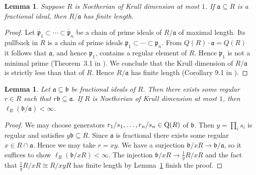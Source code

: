 \documentclass{amsart}
\theoremstyle{plain}
\newtheorem{lemma}[theorem]{Lemma}
\theoremstyle{definition}
\newcommand{\p}{\ensuremath{\mathfrak{p}}}
\begin{document}
\begin{lemma}\label{lem:artinian_quotient}
Suppose \(R\) is Noetherian of Krull dimension at most \(1\). If \(\mathfrak{a}\subseteq R\) is a fractional ideal, then \(R/\mathfrak{a}\) has finite length.
\end{lemma}
\begin{proof}
Let \(\overline{\p}_1\subset\dotsm\subset\overline{\p}_n\) be a chain of prime ideals of \(R/\mathfrak{a}\) of maximal length.
Its pullback in \(R\) is a chain of prime ideals \(\p_1\subset\dotsm\subset\p_n\).
From $Q(R)\cdot\mathfrak{a}=Q(R)$ it follows that $\mathfrak{a}$, and hence $\p_1$, contains a regular element of $R$.
Hence \(\p_1\) is not a minimal prime (Theorem~3.1 in \cite{Eisenbud}).
We conclude that the Krull dimension of \(R/\mathfrak{a}\) is strictly less than that of \(R\).
Hence \(R/\mathfrak{a}\) has finite length (Corollary 9.1 in \cite{Eisenbud}).
\end{proof}

\begin{lemma}\label{lem:quotient_length}
Let \(\mathfrak{a}\subseteq\mathfrak{b}\) be fractional ideals of \(R\).
Then there exists some regular \(r\in R\) such that \(r\mathfrak{b}\subseteq\mathfrak{a}\).
If \(R\) is Noetherian of Krull dimension at most \(1\), then \(\ell_R(\mathfrak{b}/\mathfrak{a})<\infty\).
\end{lemma}
\begin{proof}
We may choose generators \(r_1/s_1,\dotsc,r_n/s_n\in\textup{Q}(R)\) of \(\mathfrak{b}\).
Then \(y=\prod_i s_i\) is regular and satisfies \(y\mathfrak{b}\subseteq R\). 
Since \(\mathfrak{a}\) is fractional there exists some regular \(x\in R\cap\mathfrak{a}\).
Hence we may take \(r=xy\).
We have a surjection \(\mathfrak{b}/xR\to\mathfrak{b}/\mathfrak{a}\), so it suffices to show \(\ell_R(\mathfrak{b}/xR)<\infty\).
The injection \(\mathfrak{b}/xR\to \frac{1}{y} R / x R\) and the fact that \(\tfrac{1}{y}R/xR\cong R/xyR\) has finite length by Lemma~\ref{lem:artinian_quotient} finish the proof.
\end{proof}
\end{document}
